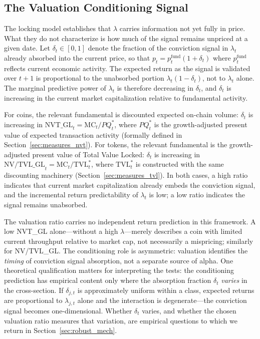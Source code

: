 \documentclass[12pt]{article}
\begin{document}
\subsection{The Valuation Conditioning Signal}
\label{sec:theory_valuation}

The locking model establishes that $\lambda$ carries information not yet fully in price.
What they do not characterize is how much of the signal remains unpriced at a given date.
Let $\delta_t \in [0,1]$ denote the fraction of the conviction signal in $\lambda_t$
already absorbed into the current price, so that $p_t = p_t^{\text{fund}}(1+\delta_t)$
where $p_t^{\text{fund}}$ reflects current economic activity. The expected return as the
signal is validated over $t+1$ is proportional to the unabsorbed portion
$\lambda_t(1 - \delta_t)$, not to $\lambda_t$ alone. The marginal predictive power of
$\lambda_t$ is therefore decreasing in $\delta_t$, and $\delta_t$ is increasing in the
current market capitalization relative to fundamental activity.

For coins, the relevant fundamental is discounted expected on-chain volume: $\delta_t$
is increasing in $\text{NVT\_GL}_t = \text{MC}_t / PQ_t^*$, where $PQ^*_t$ is the
growth-adjusted present value of expected transaction activity (formally defined in
Section~\ref{sec:measures_nvt}). For tokens, the relevant fundamental is the
growth-adjusted present value of Total Value Locked: $\delta_t$ is increasing in
$\text{NV/TVL\_GL}_t = \text{MC}_t / \text{TVL}^*_t$, where $\text{TVL}^*_t$ is
constructed with the same discounting machinery (Section~\ref{sec:measures_tvl}).
In both cases, a high ratio indicates that current market capitalization already embeds
the conviction signal, and the incremental return predictability of $\lambda_t$ is low;
a low ratio indicates the signal remains unabsorbed.

The valuation ratio carries no independent return prediction in this framework. A low
NVT\_GL alone---without a high $\lambda$---merely describes a coin with limited
current throughput relative to market cap, not necessarily a mispricing; similarly for
NV/TVL\_GL. The conditioning role is asymmetric: valuation identifies the \textit{timing}
of conviction signal absorption, not a separate source of alpha. One theoretical
qualification matters for interpreting the tests: the conditioning prediction has
empirical content only where the absorption fraction $\delta_t$ \textit{varies} in the
cross-section. If $\delta_{j,t}$ is approximately uniform within a class, expected
returns are proportional to $\lambda_{j,t}$ alone and the interaction is degenerate---the
conviction signal becomes one-dimensional. Whether $\delta_t$ varies, and whether the
chosen valuation ratio measures that variation, are empirical questions to which we
return in Section~\ref{sec:robust_mech}.
\end{document}
